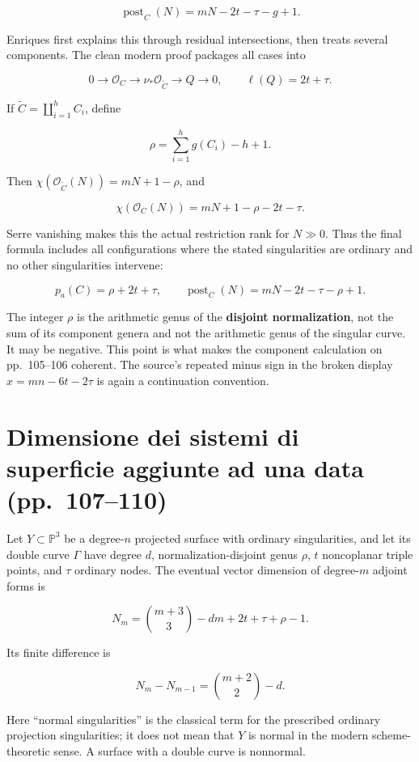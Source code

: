 \[
 \operatorname{post}_C(N)=mN-2t-\tau-g+1.
\]

Enriques first explains this through residual intersections, then treats several components. The clean modern proof packages all cases into

\[
 0\longrightarrow\mathcal O_C\longrightarrow
 \nu_*\mathcal O_{\widetilde C}\longrightarrow Q\longrightarrow0,
 \qquad\ell(Q)=2t+\tau.
\]

If \(\widetilde C=\coprod_{i=1}^h C_i\), define

\[
 \rho=\sum_{i=1}^h g(C_i)-h+1.
\]

Then \(\chi(\mathcal O_{\widetilde C}(N))=mN+1-\rho\), and

\[
 \chi(\mathcal O_C(N))=mN+1-\rho-2t-\tau.
\]

Serre vanishing makes this the actual restriction rank for \(N\gg0\). Thus the final formula includes all configurations where the stated singularities are ordinary and no other singularities intervene:

\[
 p_a(C)=\rho+2t+\tau,
 \qquad\operatorname{post}_C(N)=mN-2t-\tau-\rho+1.
\]

The integer \(\rho\) is the arithmetic genus of the \textbf{disjoint normalization}, not the sum of its component genera and not the arithmetic genus of the singular curve. It may be negative. This point is what makes the component calculation on pp.~105--106 coherent. The source's repeated minus sign in the broken display \(x=mn-6t-2\tau\) is again a continuation convention.

\section[Dimensione dei sistemi aggiunti]{Dimensione dei sistemi di superficie aggiunte ad una data (pp.~107--110)}\label{enriques-iv-3}

Let \(Y\subset\mathbb P^3\) be a degree-\(n\) projected surface with ordinary singularities, and let its double curve \(\Gamma\) have degree \(d\), normalization-disjoint genus \(\rho\), \(t\) noncoplanar triple points, and \(\tau\) ordinary nodes. The eventual vector dimension of degree-\(m\) adjoint forms is

\[
 N_m=\binom{m+3}{3}-dm+2t+\tau+\rho-1.
\]

Its finite difference is

\[
 N_m-N_{m-1}=\binom{m+2}{2}-d.
\]

Here ``normal singularities'' is the classical term for the prescribed ordinary projection singularities; it does not mean that \(Y\) is normal in the modern scheme-theoretic sense. A surface with a double curve is nonnormal.

